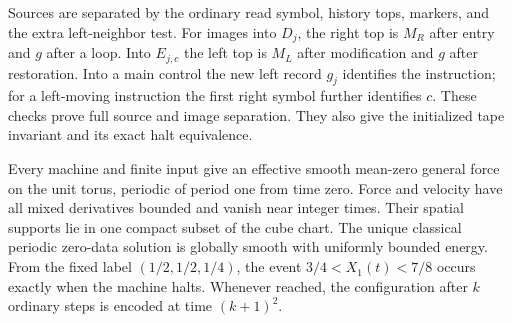 Sources are separated by the ordinary read symbol, history tops, markers,
and the extra left-neighbor test.  For images into $D_j$, the right top
is $M_R$ after entry and $g$ after a loop.  Into $E_{j,c}$ the left top
is $M_L$ after modification and $g$ after restoration.  Into a main
control the new left record $g_j$ identifies the instruction; for a
left-moving instruction the first right symbol further identifies $c$.
These checks prove full source and image separation.  They also give the
initialized tape invariant and its exact halt equivalence.

\begin{theorem}
\label{thm:sa-repeated-loader}
Every machine and finite input give an effective smooth mean-zero general
force on the unit torus, periodic of period one from time zero.  Force
and velocity have all mixed derivatives bounded and vanish near integer
times.  Their spatial supports lie in one compact subset of the cube
chart.  The unique classical periodic zero-data solution is globally
smooth with uniformly bounded energy.  From the fixed label
$(1/2,1/2,1/4)$, the event $3/4<X_1(t)<7/8$ occurs exactly when the
machine halts.  Whenever reached, the configuration after $k$ ordinary
steps is encoded at time $(k+1)^2$.
\end{theorem}

